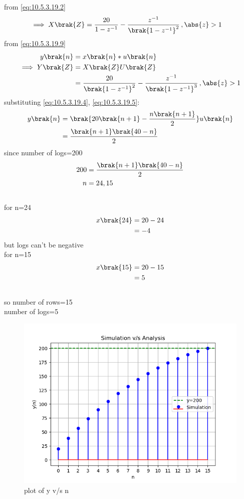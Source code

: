\documentclass[journal,12pt,twocolumn]{IEEEtran}
\theoremstyle{remark}
\begin{document}
 from \eqref{eq:10.5.3.19.2}
\begin{align} 
\implies X\brak{Z}&=\frac{20}{1-z^{-1}}-\frac{z^{-1}}{\brak{1-z^{-1}}^2}\,,\abs{z}>1
\label{eq:10.5.3.19.9}
\end{align}
from \eqref{eq:10.5.3.19.9}
\begin{align}
y\brak{n}&=x\brak{n}*u\brak{n}
\\\implies Y\brak{Z}&=X\brak{Z}U\brak{Z}
\\&=\frac{20}{\brak{1-z^{-1}}^2}-\frac{z^{-1}}{\brak{1-z^{-1}}^3}\,,\abs{z}>1
\end{align}
substituting \eqref{eq:10.5.3.19.4}, \eqref{eq:10.5.3.19.5}:
\begin{align}
y\brak{n}&=\brak{20\brak{n+1}-\frac{n\brak{n+1}}{2}}u\brak{n}
\\&=\frac{\brak{n+1}\brak{40-n}}{2}
\end{align}
since number of logs=200
\begin{align}
 200&=\frac{\brak{n+1}\brak{40-n}}{2}   
\\n&=24,15
\end{align}
\\for n=24
\begin{align}
x\brak{24}&=20-24
\\&={-4}
\end{align}
but logs can't be negative
\\for n=15
\begin{align}
x\brak{15}&=20-15
\\&=5
\end{align}
\\so number of rows=15
\\number of logs=5
\\\begin{figure}[h]
  \renewcommand\thefigure{1}
    \centering
    \includegraphics[width=1\linewidth]{ncert-maths/10/5/3/19/figs/figure_plot.png}
    \caption{plot of y v/s n}
\end{figure}
\end{document}
